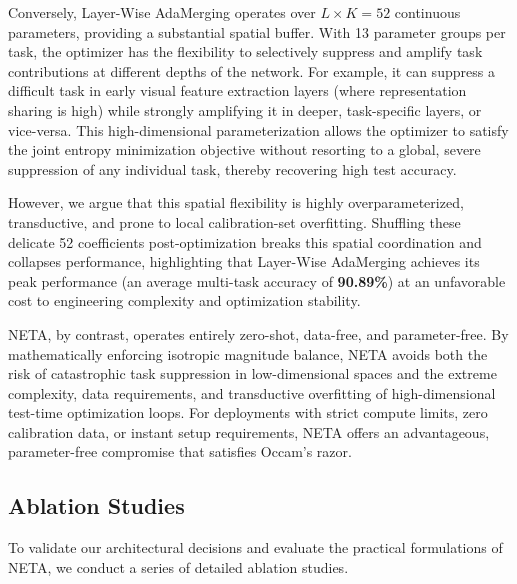 Conversely, Layer-Wise AdaMerging operates over $L \times K = 52$ continuous parameters, providing a substantial spatial buffer. With 13 parameter groups per task, the optimizer has the flexibility to selectively suppress and amplify task contributions at different depths of the network. For example, it can suppress a difficult task in early visual feature extraction layers (where representation sharing is high) while strongly amplifying it in deeper, task-specific layers, or vice-versa. This high-dimensional parameterization allows the optimizer to satisfy the joint entropy minimization objective without resorting to a global, severe suppression of any individual task, thereby recovering high test accuracy. 

However, we argue that this spatial flexibility is highly overparameterized, transductive, and prone to local calibration-set overfitting. Shuffling these delicate 52 coefficients post-optimization breaks this spatial coordination and collapses performance, highlighting that Layer-Wise AdaMerging achieves its peak performance (an average multi-task accuracy of \textbf{90.89\%}) at an unfavorable cost to engineering complexity and optimization stability.

NETA, by contrast, operates entirely zero-shot, data-free, and parameter-free. By mathematically enforcing isotropic magnitude balance, NETA avoids both the risk of catastrophic task suppression in low-dimensional spaces and the extreme complexity, data requirements, and transductive overfitting of high-dimensional test-time optimization loops. For deployments with strict compute limits, zero calibration data, or instant setup requirements, NETA offers an advantageous, parameter-free compromise that satisfies Occam's razor.

\subsection{Ablation Studies}
\label{sec:ablations}

To validate our architectural decisions and evaluate the practical formulations of NETA, we conduct a series of detailed ablation studies.

